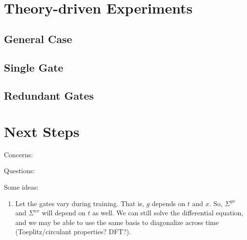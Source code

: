 \documentclass{article}
\begin{document}


\section{Theory-driven Experiments}

\subsection{General Case}

\subsection{Single Gate}

\subsection{Redundant Gates}


\section{Next Steps}
Concerns:

Questions:

Some ideas:
\begin{enumerate}
  \item Let the gates vary during training. 
  That is, $g$ depends on $t$ and $x$.
  So, $\Sigma^{yx}$ and $\Sigma^{xx}$ will depend on $t$ as well.
  We can still solve the differential equation, and we may be able to use the same basis to diagonalize across time (Toeplitz/circulant properties? DFT?).
\end{enumerate}
\end{document}
